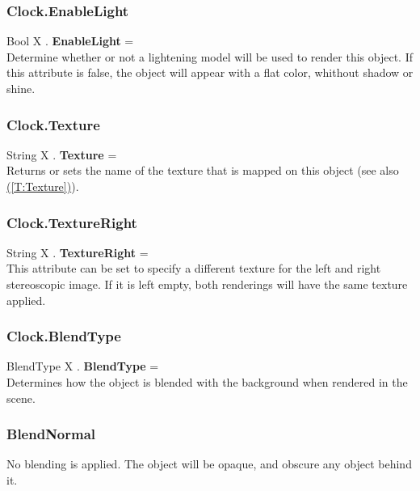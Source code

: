 \documentclass[10pt]{book}
\newcommand{\linkitem}[1]{\hyperref[#1]{\nameref{#1} (\ref{#1})}}
\begin{document}
\subsubsection{Clock.EnableLight \label{F:Clock:EnableLight}}
Bool X . \textbf{EnableLight} = \\
Determine whether or not a lightening model will be used to render this object. If this attribute is false, the object will appear with a flat color, whithout shadow or shine.

\subsubsection{Clock.Texture \label{F:Clock:Texture}}
String X . \textbf{Texture} = \\
Returns or sets the name of the texture that is mapped on this object (see also \linkitem{T:Texture}).

\subsubsection{Clock.TextureRight \label{F:Clock:TextureRight}}
String X . \textbf{TextureRight} = \\
This attribute can be set to specify a different texture for the left and right stereoscopic image. If it is left empty, both renderings will have the same texture applied.

\subsubsection{Clock.BlendType \label{F:Clock:BlendType}}
BlendType X . \textbf{BlendType} = \\
Determines how the object is blended with the background when rendered in the scene.

\subsubsection{BlendNormal \label{T:BlendType|BlendNormal}}
No blending is applied. The object will be opaque, and obscure any object behind it.
\end{document}
